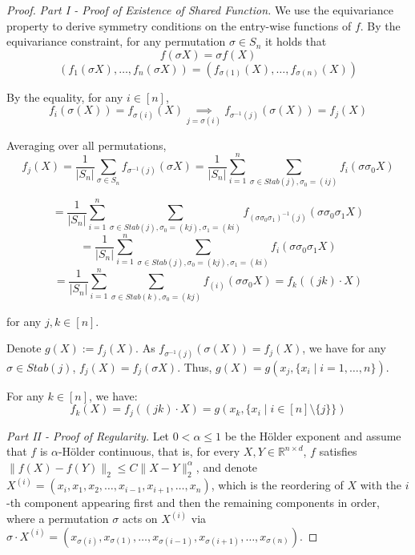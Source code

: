 \documentclass[twoside,11pt]{article}
\newcommand{\RR}{\mathbb{R}}
\begin{document}
\begin{proof}
\textit{Part I - Proof of Existence of Shared Function.} We use the equivariance property to derive symmetry conditions on the entry-wise functions of $f$. By the equivariance constraint, for any permutation $\sigma \in S_n$ it holds that
$$ f(\sigma X)=\sigma f(X) $$
$$ (f_1(\sigma X), \ldots, f_n(\sigma X)) = (f_{\sigma(1)}(X), \ldots, f_{\sigma(n)}(X)) $$

By the equality, for any $i\in [n]$,
$$ f_{i}(\sigma(X)) = f_{\sigma(i)}(X) \underset{j=\sigma(i)}{\implies} f_{\sigma^{-1}(j)}(\sigma(X)) = f_{j}(X) $$

Averaging over all permutations,
$$f_j(X) = \frac{1}{|S_n|} \sum_{\sigma \in S_n } f_{\sigma^{-1}(j)}(\sigma X) =  \frac{1}{|S_n|} \sum_{i=1}^{n} \sum_{\sigma \in Stab(j), \sigma_{0}= (ij)}  f_{i}(\sigma \sigma_{0} X)$$

$$ = \frac{1}{|S_n|} \sum_{i=1}^{n} \sum_{\sigma \in Stab(j), \sigma_{0}= (kj),\sigma_{1}=(ki)}  f_{(\sigma\sigma_0 \sigma_1)^{-1}(j)}(\sigma \sigma_{0} \sigma_1 X)$$
$$ =  \frac{1}{|S_n|} \sum_{i=1}^{n} \sum_{\sigma \in Stab(j), \sigma_{0}= (kj),\sigma_{1}=(ki)}  f_{i}(\sigma \sigma_{0}\sigma_1 X)$$
$$ = \frac{1}{|S_n|} \sum_{i=1}^{n} \sum_{\sigma \in Stab(k),\sigma_{0}=(kj)}  f_{(i)}(\sigma \sigma_0 X) = f_{k}((jk)\cdot X) $$

for any $j,k \in [n]$.

Denote $g(X):=f_{j}(X)$. As $ f_{\sigma^{-1}(j)}(\sigma(X)) = f_{j}(X)$, we have for any $\sigma \in Stab(j)$, $f_j(X)=f_j(\sigma X)$. Thus, $g(X) = g(x_j, \{ x_i \mid i=1,\ldots , n\})$.


For any $k\in [n]$, we have:
$$ f_{k}(X) = f_{j}((jk)\cdot X) = g(x_k, \{ x_i \mid i\in [n]\setminus \{j\} \})$$



\textit{Part II - Proof of Regularity.}
Let $0< \alpha\leq 1$ be the H\"older exponent and assume that $f$ is $\alpha$-H\"older continuous, that is, for every $X,Y \in \RR^{n \times d}$, $f$ satisfies $\|f(X)-f(Y)\|_2 \leq C \| X-Y \|_2^{\alpha}$, and 
denote $X^{(i)} = (x_i, x_1, x_2, \ldots, x_{i-1}, x_{i+1}, \ldots, x_n)$, which is the reordering of $X$ with the $i$-th component appearing first and then the remaining components in order, where a permutation $\sigma$ acts on $X^{(i)}$ via $\sigma \cdot X^{(i)} = (x_{\sigma(i)}, x_{\sigma(1)}, \ldots, x_{\sigma(i-1)}, x_{\sigma(i+1)}, \ldots, x_{\sigma(n)} )$.
    


\end{proof}
\end{document}
